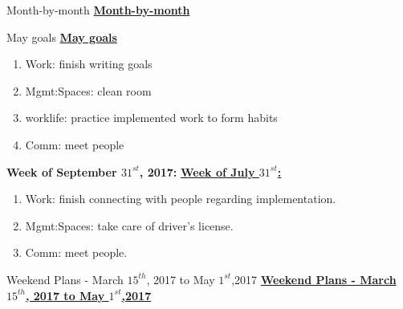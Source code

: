 \begin{columns}
\begin{column}{0.5\columnwidth}
\ifdefined\POSTER
    \begin{block}{Month-by-month}
\else
\underline{\bf Month-by-month}
\fi
      \begin{itemize}

\ifdefined\POSTER
\begin{block}{May goals}
\else
\underline{\bf May goals}\\
\fi

\begin{enumerate}
\item \small Work: finish writing goals
  \small \item \small Mgmt:Spaces: clean room
\item \small worklife: practice implemented work to form habits
\item \small Comm: meet people
\end{enumerate}

\ifdefined\POSTER
\end{block}
\fi

\ifdefined\POSTER
\begin{block}{\small \bf Week of September $31^{st}$, 2017:}
\else
\underline{\bf Week of July $31^{st}$: }\\
\fi

\begin{enumerate}
\tiny \item \tiny Work: finish connecting with people regarding implementation.
\item \tiny Mgmt:Spaces: take care of driver's license.
\item \tiny Comm: meet people.
\end{enumerate}

\ifdefined\POSTER
\end{block}
\fi

\ifdefined\POSTER
\begin{block}{Weekend Plans - March $15^{th}$, 2017 to May $1^{st}$,2017}
\else
{\underline{\bf Weekend Plans - March $15^{th}$, 2017 to May $1^{st}$,2017}}\\
\fi




\end{block}
\end{itemize}
\end{block}
\end{column}
\end{columns}
